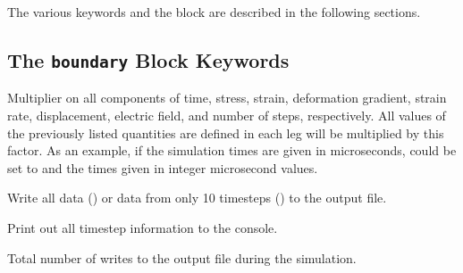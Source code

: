 \documentclass[letterpaper,10pt,english]{sphinxmanual}
\begin{document}
The various keywords and the  block are described in the following sections.


\subsection{The \texttt{boundary} Block Keywords}
\label{Files/input_file_formatting:the-boundary-block-keywords}\label{Files/input_file_formatting:legs-keywords}\label{Files/input_file_formatting:xstar-keywords}

\begin{fulllineitems}
\end{fulllineitems}


Multiplier on all components of time, stress, strain, deformation gradient,
strain rate, displacement, electric field, and number of steps, respectively. All
values of the previously listed quantities are defined in each leg will be
multiplied by this factor. As an example, if the simulation times are given in
microseconds,  could be set to  and the times given in integer
microsecond values.
\label{Files/input_file_formatting:emit-keyword}

\begin{fulllineitems}
\label{Files/input_file_formatting:emit}
\end{fulllineitems}


Write all data () or data from only 10 timesteps () to the output file.
\label{Files/input_file_formatting:screenout-keyword}

\begin{fulllineitems}
\label{Files/input_file_formatting:screenout}
\end{fulllineitems}


Print out all timestep information to the console.
\label{Files/input_file_formatting:nprints-keyword}

\begin{fulllineitems}
\label{Files/input_file_formatting:nprints}
\end{fulllineitems}


Total number of writes to the output file during the simulation.
\label{Files/input_file_formatting:ampl-keyword}
\end{document}
